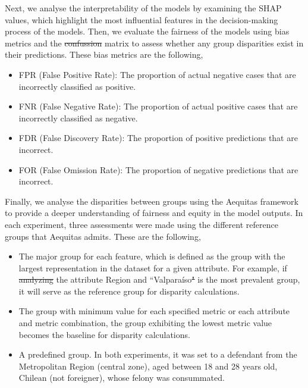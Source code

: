 \documentclass[fleqn,10pt]{wlscirep}
\providecommand{\DIFadd}[1]{{\protect\color{blue}\uwave{#1}}} %
\providecommand{\DIFdel}[1]{{\protect\color{red}\sout{#1}}}                      %
\providecommand{\DIFaddbegin}{} %
\providecommand{\DIFaddend}{} %
\providecommand{\DIFdelbegin}{} %
\providecommand{\DIFdelend}{} %
\begin{document}
Next, we analyse the interpretability of the models by examining the SHAP values, which highlight the most influential features in the decision-making process of the models. Then, we evaluate the fairness of the models using bias metrics and the \DIFdelbegin \DIFdel{confussion }\DIFdelend \DIFaddbegin \DIFadd{confusion }\DIFaddend matrix to assess whether any group disparities exist in their predictions. These bias metrics are the following,
\begin{itemize}
    \item FPR (False Positive Rate): The proportion of actual negative cases that are incorrectly classified as positive.
    \item FNR (False Negative Rate): The proportion of actual positive cases that are incorrectly classified as negative.
    \item FDR (False Discovery Rate): The proportion of positive predictions that are incorrect.
    \item FOR (False Omission Rate): The proportion of negative predictions that are incorrect. 

\end{itemize}

Finally, we analyse the disparities between groups using the Aequitas framework to provide a deeper understanding of fairness and equity in the model outputs.  In each experiment, three assessments were made using the different reference groups that Aequitas admits. These are the following, 

\begin{itemize}
    \item The major group for each feature, which is defined as the group with the largest representation in the dataset for a given attribute. For example, if \DIFdelbegin \DIFdel{analyzing }\DIFdelend \DIFaddbegin \DIFadd{analysing }\DIFaddend the attribute Region and ``Valparaíso\DIFdelbegin \DIFdel{" }\DIFdelend \DIFaddbegin \DIFadd{'' }\DIFaddend is the most prevalent group, it will serve as the reference group for disparity calculations.  
    \item The group with minimum value for each specified metric or each attribute and metric combination, the group exhibiting the lowest metric value becomes the baseline for disparity calculations. 
    \item A predefined group. In both experiments, it was set to a defendant from the Metropolitan Region (central zone), aged between 18 and 28 years old, Chilean (not foreigner), whose felony was consummated. 
\end{itemize}
\end{document}
